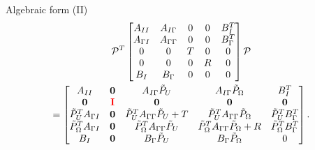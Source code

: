 \documentclass{beamer}
\begin{document}
		\begin{frame}{Algebraic form (II)}
			\begin{multline*}
			\mathcal{P}^T \begin{bmatrix}
			A_{II} & A_{I\Gamma} & 0 & 0 & B_{I}^T  \\
			A_{\Gamma I} & A_{\Gamma \Gamma}  & 0 & 0 & B_{\Gamma}^T\\
			0 & 0 & T & 0 & 0 \\
			0 & 0 & 0& R & 0\\
			B_I & B_\Gamma & 0 & 0 & 0   \\
			\end{bmatrix} \mathcal{P} 
			\\= 
			\begin{bmatrix}
			A_{II} & \textbf{0} & A_{I\Gamma}\tilde{P}_U   & A_{I\Gamma}  \tilde{P}_\Omega  & B_{I}^T  \\
			\textbf{0} & \textbf{\textcolor{red}{I}} & \textbf{0} & \textbf{0} & \textbf{0} \\
			\tilde{P}_U^T A_{\Gamma I} & \textbf{0} & \tilde{P}_U ^T A_{\Gamma \Gamma} \tilde{P}_U  + T   & \tilde{P}_U ^T A_{\Gamma \Gamma} \tilde{P}_\Omega & \tilde{P}_U^TB_{\Gamma}^T\\
			\tilde{P}_\Omega^T A_{\Gamma I} & \textbf{0} & \tilde{P}_\Omega ^T A_{\Gamma \Gamma} \tilde{P}_U & \tilde{P}_\Omega ^T A_{\Gamma \Gamma} \tilde{P}_\Omega  + R& \tilde{P}_\Omega^TB_{\Gamma}^T\\
			B_I & \textbf{0}  & B_\Gamma\tilde{P}_U &  B_\Gamma\tilde{P}_\Omega & 0   \\
			\end{bmatrix}.
			\end{multline*}
	\end{frame}
\end{document}
